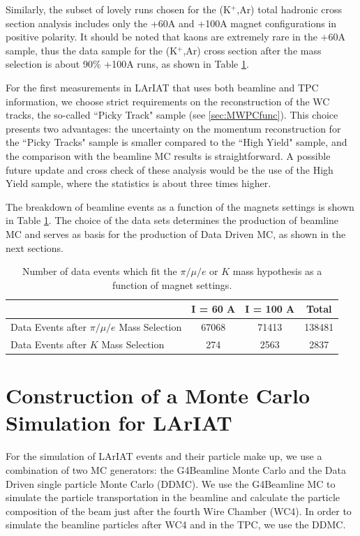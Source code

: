 Similarly, the subset of lovely runs chosen  for the (K$^{+}$,Ar)  total hadronic cross section analysis includes only the +60A and +100A magnet configurations in positive polarity. It should be noted that kaons are extremely rare in the +60A sample, thus the data sample for the (K$^{+}$,Ar) cross section after the mass selection is about 90\% +100A runs, as shown in Table \ref{tab:databreakdown}.

For the first measurements in LArIAT that uses both beamline and TPC information, we choose strict requirements on the reconstruction of the WC tracks, the so-called ``Picky Track" sample (see \ref{sec:MWPCfunc}). This choice presents two advantages:  the uncertainty on the momentum reconstruction for the ``Picky Tracks" sample is smaller compared to the ``High Yield" sample, and the comparison with the beamline MC results is straightforward. A possible future update and cross check of these analysis would be the use of the High Yield sample, where the statistics is about three times higher. 

The breakdown of beamline events as a function of the magnets settings is shown in Table \ref{tab:databreakdown}. 
The choice of the data sets determines the production of beamline MC and serves as basis for the production of Data Driven MC, as shown in the next sections.

\begin{table}[b]
\centering
\begin{tabular}{|l|c|c|c|}  
\hline
                                                              & I = 60 A          & I = 100 A   & Total     \\ \hline
Data Events after $\pi/\mu/e$ Mass Selection     &     67068          &  71413  & 138481 \\ \hline
Data Events after $K$ Mass Selection                &     274              &   2563   & 2837  \\ \hline
\end{tabular}
\caption{Number of data events which fit the $\pi/\mu/e$ or $K$ mass hypothesis as a function of magnet settings.}
\label{tab:databreakdown}
\end{table}



\section{Construction of a Monte Carlo Simulation for LArIAT}\label{sec:MCSet}
For the simulation of LArIAT events and their particle make up, we use a combination of two MC generators: the G4Beamline Monte Carlo and the Data Driven single particle Monte Carlo (DDMC). We use the G4Beamline MC to simulate the particle transportation in the beamline and calculate the particle composition of the beam just after the fourth Wire Chamber (WC4). In order to simulate the beamline particles after WC4 and in the TPC, we use the DDMC.

